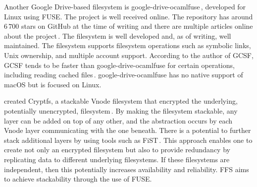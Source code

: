 Another Google Drive-based filesystem is google-drive-ocamlfuse\,\cite{stradaGoogledriveocamlfuse2022}, developed for Linux using FUSE. The project is well received online. The repository has around $6\,700$ stars on GitHub at the time of writing and there are multiple articles online about the project\,\cite{guoanInstallGoogleDrive2021,sneddonMountYourGoogle2017,aminUseGoogleDrive2021}. The filesystem is well developed and, as of writing, well maintained. The filesystem supports filesystem operations such as symbolic links, Unix ownership, and multiple account support. According to the author of GCSF, GCSF tends to be faster than google-drive-ocamlfuse for certain operations, including reading cached files\,\cite{shubhamharnalShortGCSFTends2018,harababurelShowHNGoogle2018,}. google-drive-ocamlfuse has no native support of macOS but is focused on Linux. 

\citeauthor{zadokCryptfsStackableVnode1998} created Cryptfs, a stackable Vnode filesystem that encrypted the underlying, potentially unencrypted, filesystem\,\cite{zadokCryptfsStackableVnode1998}. By making the filesystem stackable, any layer can be added on top of any other, and the abstraction occurs by each Vnode layer communicating with the one beneath. There is a potential to further stack additional layers by using tools such as FiST\,\cite{FiSTStackableFile}. This approach enables one to create not only an encrypted filesystem but also to provide redundancy by replicating data to different underlying filesystems. If these filesystems are independent, then this potentially increases availability and reliability. FFS aims to achieve stackability through the use of FUSE. 
